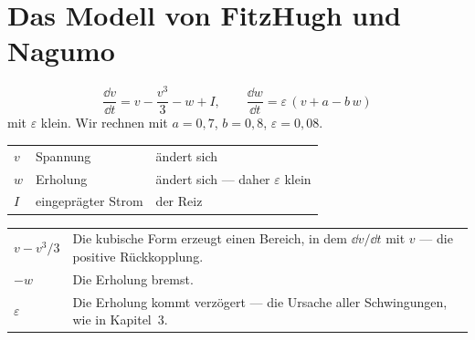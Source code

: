 \section{Das Modell von FitzHugh und Nagumo}

\begin{definition}
\[ \frac{\dd v}{\dd t} = v - \frac{v^3}{3} - w + I, \qquad \frac{\dd w}{\dd t} = \varepsilon\,(v + a - b\,w) \]
mit $\varepsilon$ klein. Wir rechnen mit $a=0{,}7$, $b=0{,}8$, $\varepsilon=0{,}08$.
\end{definition}

\begin{merksatz}
\begin{center}
{\small
\renewcommand{\arraystretch}{1.5}
\begin{tabular}{@{}P{1.4cm}P{2.8cm}P{3.8cm}@{}}
\toprule
$v$ & Spannung & ändert sich \\
$w$ & Erholung & ändert sich  --- daher $\varepsilon$ klein\\
$I$ & eingeprägter Strom & der Reiz\\
\bottomrule
\end{tabular}}
\end{center}

\begin{center}
\renewcommand{\arraystretch}{1.5}
\begin{tabular}{@{}P{2.4cm}P{6.2cm}@{}}
\toprule
$v - v^3/3$ & Die kubische Form erzeugt einen Bereich, in dem $\dd v/\dd t$ mit $v$  --- die positive Rückkopplung.\\
$-w$ & Die Erholung bremst.\\
$\varepsilon$ & Die Erholung kommt verzögert --- die Ursache aller Schwingungen, wie in Kapitel~3.\\
\bottomrule
\end{tabular}
\end{center}
\end{merksatz}

